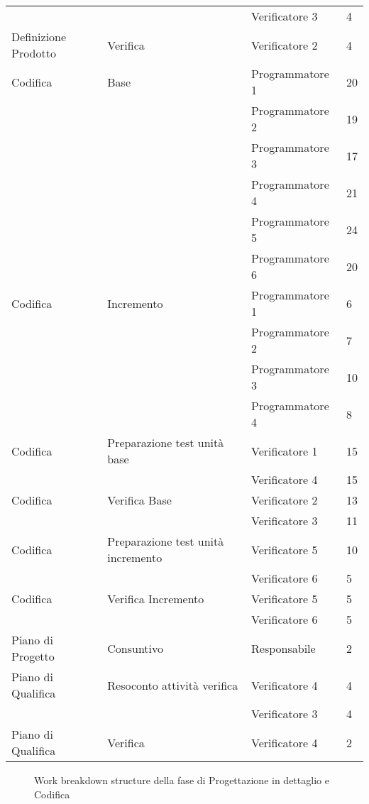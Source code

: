 {{\begin{longtable} [c]{| l | l | l | l |}
		 &	&	Verificatore 3 & 4\\
		 Definizione Prodotto & Verifica & Verificatore 2 & 4 \\
		 Codifica & Base & Programmatore 1 & 20\\
		 &	&	Programmatore 2 & 19\\
		 &	&	Programmatore 3 & 17\\
		 &	&	Programmatore 4 & 21\\
		 &	&	Programmatore 5 & 24\\
		 &	&	Programmatore 6 & 20\\
		 Codifica & Incremento & Programmatore 1 & 6\\
		 &	&	Programmatore 2 & 7\\
		 &	&	Programmatore 3 & 10\\
		 &	&	Programmatore 4 & 8\\
		 Codifica & Preparazione test unità base & Verificatore 1 & 15\\
		 &	&	Verificatore 4 & 15\\
		 Codifica & Verifica Base & Verificatore 2 & 13\\
		 &	&	Verificatore 3 & 11\\
		 Codifica & Preparazione test unità incremento & Verificatore 5 & 10\\
		 &	&	Verificatore 6 & 5\\
		 Codifica & Verifica Incremento & Verificatore 5 & 5\\
		 &	&	Verificatore 6 & 5\\
		 Piano di Progetto & Consuntivo & Responsabile & 2 \\
		 Piano di Qualifica & Resoconto attività verifica & Verificatore 4 & 4\\
		 &	&	Verificatore 3 & 4\\
		 Piano di Qualifica & Verifica & Verificatore 4 & 2 \\
	\end{longtable}

	\begin{landscape}
		\thispagestyle{empty}
		\begin{figure}[H]
			\parbox[c][\textwidth][s]{\linewidth}{
			\centering
			\vspace*{\fill}
			\vspace*{\fill}
			\label{fig:wbsCodifica}
			\caption{Work breakdown structure della fase di Progettazione in dettaglio e Codifica}}
		\end{figure}
	\end{landscape}
}

}
